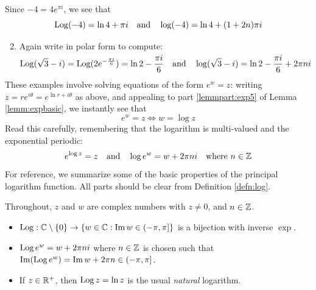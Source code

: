 
\begin{examples}{}{}
	\exstart Since $-4=4e^{\pi i}$, we see that
	\[
		\operatorname{Log}(-4)=\ln 4+\pi i\quad\text{and}\quad \log(-4)=\ln 4+(1+2n)\pi i\]
	\begin{enumerate}\setcounter{enumi}{1}
		\item Again write in polar form to compute:
		\[
			\operatorname{Log}(\sqrt 3-i)=\operatorname{Log}(2e^{-\frac{\pi i}{6}})=\ln 2-\smash{\frac{\pi i}6}\quad\text{and}\quad \log (\sqrt 3-i)=\ln 2-\smash{\frac{\pi i}6}+2\pi ni
		\]
	\end{enumerate}
\end{examples}

These examples involve solving equations of the form $e^w=z$: writing $z=re^{i\theta}=e^{\ln r+i\theta}$ as above, and appealing to part \ref{lemmpart:exp5} of Lemma \ref*{lemm:expbasic}, we instantly see that
\[
	e^w=z\iff w=\log z
\]
Read this carefully, remembering that the logarithm is multi-valued and the exponential periodic:
\[
	e^{\log z}=z
	\quad\text{and}\quad
	\log e^w=w+2\pi ni\quad\text{where $n\in\mathbb{Z}$}
\]
For reference, we summarize some of the basic properties of the principal logarithm function. All parts should be clear from Definition \ref{defn:log}.


\begin{lemm}{}{}
	Throughout, $z$ and $w$ are complex numbers with $z\neq 0$, and $n\in\mathbb{Z}$.
	\begin{itemize}
	  \item $\operatorname{Log}:\mathbb{C}\setminus\{0\}\to \{w\in\mathbb{C}:\operatorname{Im} w\in(-\pi,\pi]\}$ is a bijection with inverse $\exp$.
	  \item $\operatorname{Log} e^w=w+2\pi ni$ where $n\in\mathbb{Z}$ is chosen such that $\operatorname{Im}(\operatorname{Log} e^w)=\operatorname{Im} w+2\pi n\in(-\pi,\pi]$.
	  \item If $z\in\mathbb{R}^+$, then $\operatorname{Log} z=\ln z$ is the usual \emph{natural} logarithm.
	\end{itemize}
\end{lemm}


\goodbreak

\label{sec:loglaws}

